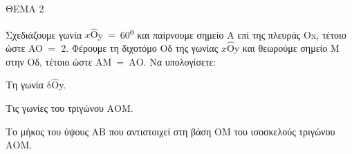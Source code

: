 
ΘΕΜΑ 2

Σχεδιάζουμε γωνία $x\widehat{\text{O}}$y$\  = \ $60\textsuperscript{ο} και παίρνουμε σημείο Α επί της πλευράς Οx, τέτοιο ώστε AO$\  =$ 2. Φέρουμε τη διχοτόμο Οδ της γωνίας $x\widehat{\text{O}}$y και θεωρούμε σημείο Μ στην Οδ, τέτοιο ώστε AΜ$\  = \ $ΑΟ. Να υπολογίσετε:

\begin{alist}
\item Τη γωνία $\text{δ}\widehat{\text{O}}$y.


\item Τις γωνίες του τριγώνου ΑΟΜ.


\item Το μήκος του ύψους ΑB που αντιστοιχεί στη βάση ΟΜ του ισοσκελούς τριγώνου ΑΟΜ.



\end{alist}
